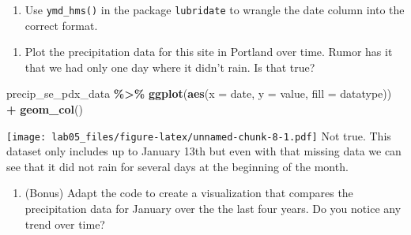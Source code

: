 \documentclass[
]{article}
\newenvironment{Shaded}{\begin{snugshade}}{\end{snugshade}}
\newcommand{\AttributeTok}[1]{\textcolor[rgb]{0.13,0.29,0.53}{#1}}
\newcommand{\FunctionTok}[1]{\textcolor[rgb]{0.13,0.29,0.53}{\textbf{#1}}}
\newcommand{\NormalTok}[1]{#1}
\newcommand{\OtherTok}[1]{\textcolor[rgb]{0.56,0.35,0.01}{#1}}
\newcommand{\SpecialCharTok}[1]{\textcolor[rgb]{0.81,0.36,0.00}{\textbf{#1}}}
\providecommand{\tightlist}{%
  \setlength{\itemsep}{0pt}\setlength{\parskip}{0pt}}
\begin{document}
\begin{enumerate}
\def\labelenumi{\alph{enumi}.}
\setcounter{enumi}{4}
\tightlist
\item
  Use \texttt{ymd\_hms()} in the package \texttt{lubridate} to wrangle
  the date column into the correct format.
\end{enumerate}

\begin{Shaded}
\end{Shaded}

\begin{enumerate}
\def\labelenumi{\alph{enumi}.}
\setcounter{enumi}{5}
\tightlist
\item
  Plot the precipitation data for this site in Portland over time. Rumor
  has it that we had only one day where it didn't rain. Is that true?
\end{enumerate}

\begin{Shaded}
\begin{Highlighting}[]
\NormalTok{precip\_se\_pdx\_data }\SpecialCharTok{\%\textgreater{}\%}
  \FunctionTok{ggplot}\NormalTok{(}\FunctionTok{aes}\NormalTok{(}\AttributeTok{x =}\NormalTok{ date, }\AttributeTok{y =}\NormalTok{ value, }\AttributeTok{fill =}\NormalTok{ datatype)) }\SpecialCharTok{+}
  \FunctionTok{geom\_col}\NormalTok{()}
\end{Highlighting}
\end{Shaded}

\texttt{[image: lab05\_files/figure-latex/unnamed-chunk-8-1.pdf]} Not
true. This dataset only includes up to January 13th but even with that
missing data we can see that it did not rain for several days at the
beginning of the month.

\begin{enumerate}
\def\labelenumi{\alph{enumi}.}
\setcounter{enumi}{6}
\tightlist
\item
  (Bonus) Adapt the code to create a visualization that compares the
  precipitation data for January over the the last four years. Do you
  notice any trend over time?
\end{enumerate}
\end{document}

